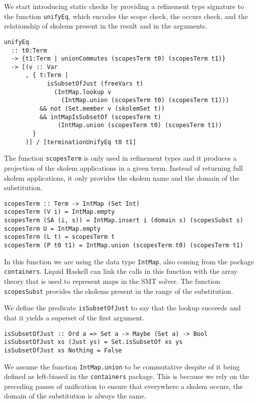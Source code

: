 \documentclass[sigconf, anonymous, review]{acmart}
\newcommand{\tc}[1]{{\small\texttt{#1}}}
\begin{document}
We start introducing static checks by providing a refinement type signature to
the function \tc{unifyEq}, which encodes the scope check, the occurs check,
and the relationship of skolems present in the result and in the arguments.

\begin{verbatim}
unifyEq
  :: t0:Term
  -> {t1:Term | unionCommutes (scopesTerm t0) (scopesTerm t1)}
  -> [(v :: Var
      , { t:Term |
            isSubsetOfJust (freeVars t)
              (IntMap.lookup v
                (IntMap.union (scopesTerm t0) (scopesTerm t1)))
          && not (Set.member v (skolemSet t))
          && intMapIsSubsetOf (scopesTerm t)
               (IntMap.union (scopesTerm t0) (scopesTerm t1))
        }
      )] / [terminationUnifyEq t0 t1]
\end{verbatim}

The function \tc{scopesTerm} is only used in refinement types and it produces
a projection of the skolem applications in a given term. Instead of returning
full skolem applications, it only provides the skolem name and the domain of
the substitution.

\begin{verbatim}
scopesTerm :: Term -> IntMap (Set Int)
scopesTerm (V i) = IntMap.empty
scopesTerm (SA (i, s)) = IntMap.insert i (domain s) (scopesSubst s)
scopesTerm U = IntMap.empty
scopesTerm (L t) = scopesTerm t
scopesTerm (P t0 t1) = IntMap.union (scopesTerm t0) (scopesTerm t1)
\end{verbatim}

In this function we are using the data type \tc{IntMap}, also coming from the
package \tc{containers}. Liquid Haskell can link the calls in this function
with the array theory that is used to represent maps in the SMT solver.
The function \tc{scopesSubst} provides the skolems present in the range of
the substitution.

We define the predicate \tc{isSubsetOfJust} to say that the lookup succeeds
and that it yields a superset of the first argument.

\begin{verbatim}
isSubsetOfJust :: Ord a => Set a -> Maybe (Set a) -> Bool
isSubsetOfJust xs (Just ys) = Set.isSubsetOf xs ys
isSubsetOfJust xs Nothing = False
\end{verbatim}

We assume the function \tc{IntMap.union} to be commutative despite of it being
defined as left-biased in the \tc{containers} package. This is because we
rely on the preceding passes of unification to ensure that everywhere a
skolem occurs, the domain of the substitution is always the same.
\end{document}
